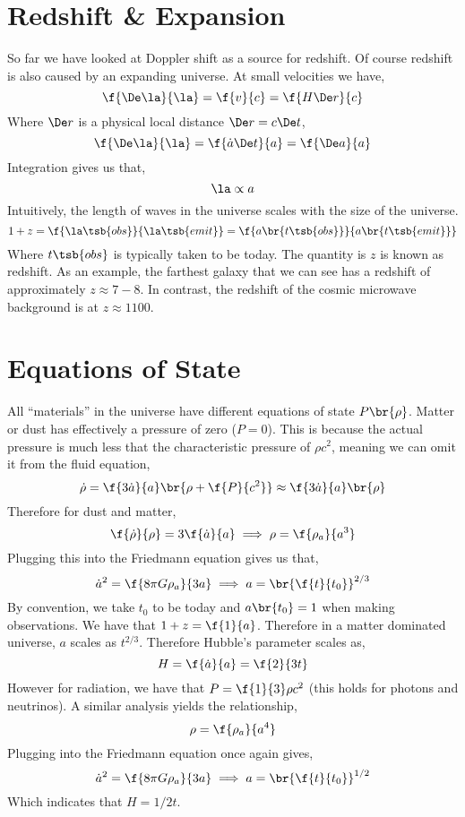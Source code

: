\documentclass{article}
\begin{document}
\section{Redshift \& Expansion}
So far we have looked at Doppler shift as a source for redshift. Of course redshift is also caused by an expanding universe. At small velocities we have,
\[ \f{\De \la}{\la} = \f{v}{c} = \f{H \De r}{c} \]
Where $\De r$ is a physical local distance $\De r = c \De t$,
\[ \f{\De \la}{\la} = \f{\dot a \De t}{a} = \f{\De a}{a} \]
Integration gives us that,
\[ \la \propto a \]
Intuitively, the length of waves in the universe scales with the size of the universe.
\[ 1 + z = \f{\la\tsb{obs}}{\la\tsb{emit}} = \f{a\br{t\tsb{obs}}}{a\br{t\tsb{emit}}}  \]
Where $t\tsb{obs}$ is typically taken to be today. The quantity is $z$ is known as redshift. As an example, the farthest galaxy that we can see has a redshift of approximately $z \approx 7-8$. In contrast, the redshift of the cosmic microwave background is at $z \approx 1100$.

\section{Equations of State}
All ``materials'' in the universe have different equations of state $P\br{\rho}$. Matter or dust has effectively a pressure of zero ($P = 0$). This is because the actual pressure is much less that the characteristic pressure of $\rho c^2$, meaning we can omit it from the fluid equation,
\[ \dot\rho = \f{3 \dot a}{a} \br{\rho + \f{P}{c^2}} \approx \f{3 \dot a}{a} \br{\rho} \]
Therefore for dust and matter,
\[ \f{\dot \rho}{\rho} = 3\f{\dot a}{a} \implies \rho = \f{\rho_a}{a^3} \]
Plugging this into the Friedmann equation gives us that,
\[ \dot a^2 = \f{8\pi G \rho_a}{3a} \implies a = \br{\f{t}{t_0}}^{2/3} \]
By convention, we take $t_0$ to be today and $a\br{t_0} = 1$ when making observations. We have that $1 + z = \f{1}{a}$. Therefore in a matter dominated universe, $a$ scales as $t^{2/3}$. Therefore Hubble's parameter scales as,
\[ H = \f{\dot a}{a} = \f{2}{3t} \]
However for radiation, we have that $P = \f{1}{3} \rho c^2$ (this holds for photons and neutrinos). A similar analysis yields the relationship,
\[ \rho = \f{\rho_a}{a^4} \]
Plugging into the Friedmann equation once again gives,
\[ \dot a^2 = \f{8\pi G \rho_a}{3a} \implies a = \br{\f{t}{t_0}}^{1/2} \]
Which indicates that $H = 1/2t$. \\
\end{document}
